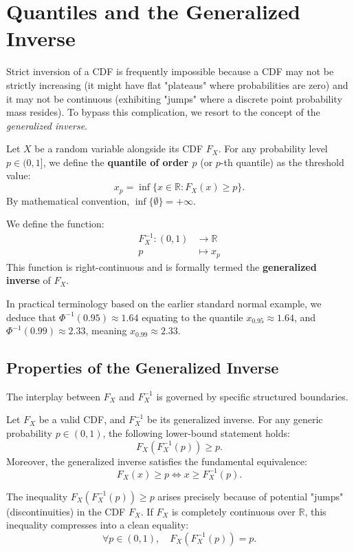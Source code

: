 \section{Quantiles and the Generalized Inverse}

Strict inversion of a CDF is frequently impossible because a CDF may not be strictly increasing (it might have flat "plateaus" where probabilities are zero) and it may not be continuous (exhibiting "jumps" where a discrete point probability mass resides). To bypass this complication, we resort to the concept of the \textit{generalized inverse}.

\begin{definition}
Let $X$ be a random variable alongside its CDF $F_X$. For any probability level $p \in (0, 1]$, we define the \textbf{quantile of order $p$} (or $p$-th quantile) as the threshold value:
$$
x_p = \inf \{x \in \mathbb{R} : F_X(x) \geq p\}.
$$
By mathematical convention, $\inf\{\emptyset\} = +\infty$.

We define the function:
\begin{align*}
    F_X^{-1} : (0, 1) &\to \mathbb{R} \\
    p &\mapsto x_p
\end{align*}
This function is right-continuous and is formally termed the \textbf{generalized inverse} of $F_X$.
\end{definition}

In practical terminology based on the earlier standard normal example, we deduce that $\Phi^{-1}(0.95) \approx 1.64$ equating to the quantile $x_{0.95} \approx 1.64$, and $\Phi^{-1}(0.99) \approx 2.33$, meaning $x_{0.99} \approx 2.33$.

\subsection{Properties of the Generalized Inverse}

The interplay between $F_X$ and $F_X^{-1}$ is governed by specific structured boundaries.

\begin{proposition}
Let $F_X$ be a valid CDF, and $F_X^{-1}$ be its generalized inverse. For any generic probability $p \in (0, 1)$, the following lower-bound statement holds:
$$
F_X\left(F_X^{-1}(p)\right) \geq p.
$$
Moreover, the generalized inverse satisfies the fundamental equivalence:
$$
F_X(x) \geq p \iff x \geq F_X^{-1}(p).
$$
\end{proposition}
\begin{remark}
The inequality $F_X(F_X^{-1}(p)) \geq p$ arises precisely because of potential "jumps" (discontinuities) in the CDF $F_X$. If $F_X$ is completely continuous over $\mathbb{R}$, this inequality compresses into a clean equality:
$$
\forall p \in (0, 1), \quad F_X(F_X^{-1}(p)) = p.
$$
\end{remark}

